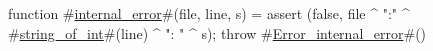 function #\hyperref[sailRISCVzinternalzyerror]{internal\_error}#(file, line, s) = {
    assert (false, file ^ ":" ^ #\hyperref[sailRISCVzstringzyofzyint]{string\_of\_int}#(line) ^ ": " ^ s);
    throw #\hyperref[sailRISCVzErrorzyinternalzyerror]{Error\_internal\_error}#()
}
